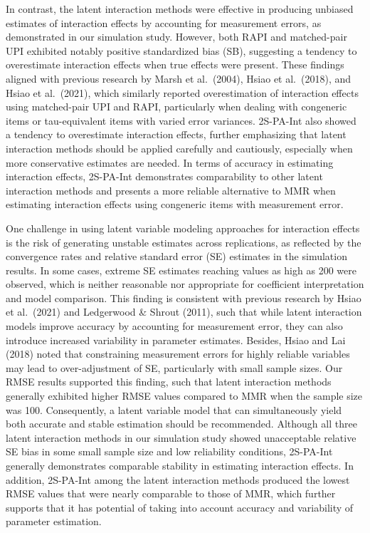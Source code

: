 \documentclass[
  man]{apa6}
\begin{document}
In contrast, the latent interaction methods were effective in producing unbiased estimates of interaction effects by accounting for measurement errors, as demonstrated in our simulation study. However, both RAPI and matched-pair UPI exhibited notably positive standardized bias (SB), suggesting a tendency to overestimate interaction effects when true effects were present. These findings aligned with previous research by Marsh et al.~(2004), Hsiao et al.~(2018), and Hsiao et al.~(2021), which similarly reported overestimation of interaction effects using matched-pair UPI and RAPI, particularly when dealing with congeneric items or tau-equivalent items with varied error variances. 2S-PA-Int also showed a tendency to overestimate interaction effects, further emphasizing that latent interaction methods should be applied carefully and cautiously, especially when more conservative estimates are needed. In terms of accuracy in estimating interaction effects, 2S-PA-Int demonstrates comparability to other latent interaction methods and presents a more reliable alternative to MMR when estimating interaction effects using congeneric items with measurement error.

One challenge in using latent variable modeling approaches for interaction effects is the risk of generating unstable estimates across replications, as reflected by the convergence rates and relative standard error (SE) estimates in the simulation results. In some cases, extreme SE estimates reaching values as high as 200 were observed, which is neither reasonable nor appropriate for coefficient interpretation and model comparison. This finding is consistent with previous research by Hsiao et al.~(2021) and Ledgerwood \& Shrout (2011), such that while latent interaction models improve accuracy by accounting for measurement error, they can also introduce increased variability in parameter estimates. Besides, Hsiao and Lai (2018) noted that constraining measurement errors for highly reliable variables may lead to over-adjustment of SE, particularly with small sample sizes. Our RMSE results supported this finding, such that latent interaction methods generally exhibited higher RMSE values compared to MMR when the sample size was 100. Consequently, a latent variable model that can simultaneously yield both accurate and stable estimation should be recommended. Although all three latent interaction methods in our simulation study showed unacceptable relative SE bias in some small sample size and low reliability conditions, 2S-PA-Int generally demonstrates comparable stability in estimating interaction effects. In addition, 2S-PA-Int among the latent interaction methods produced the lowest RMSE values that were nearly comparable to those of MMR, which further supports that it has potential of taking into account accuracy and variability of parameter estimation.
\end{document}
